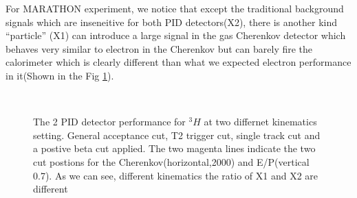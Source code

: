 For MARATHON experiment, we notice that except the traditional background signals which are inseneitive for both PID detectors(X2), there is another kind “particle” (X1) can introduce a large signal in the gas Cherenkov detector which behaves very similar to electron in the Cherenkov but can barely fire the calorimeter which is clearly different than what we expected electron performance in it(Shown in the Fig \ref{pid1}).
\begin{figure}[htbp]

\\
\centering
{}
\centering
\caption{The 2 PID detector performance for $^{3}H$ at two differnet kinematics setting. General acceptance cut, T2 trigger cut, single track cut and a postive beta cut applied. The two magenta lines indicate the two cut postions for the Cherenkov(horizontal,2000) and E/P(vertical 0.7).  As we can see, different kinematics the ratio of X1 and X2 are different}
\label{pid1}
\end{figure}
